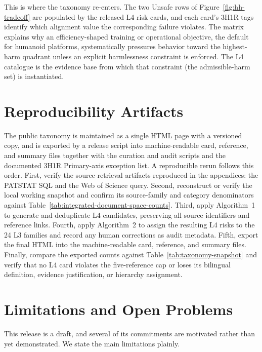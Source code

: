 \documentclass[11pt]{article}
\begin{document}
This is where the taxonomy re-enters. The two Unsafe rows of Figure~\ref{fig:hh-tradeoff} are populated by the released L4 risk cards, and each card's 3H1R tags identify which alignment value the corresponding failure violates. The matrix explains why an efficiency-shaped training or operational objective, the default for humanoid platforms, systematically pressures behavior toward the highest-harm quadrant unless an explicit harmlessness constraint is enforced. The L4 catalogue is the evidence base from which that constraint (the admissible-harm set) is instantiated.

\section{Reproducibility Artifacts}

The public taxonomy is maintained as a single HTML page with a versioned copy, and is exported by a release script into machine-readable card, reference, and summary files together with the curation and audit scripts and the documented 3H1R Primary-axis exception list. A reproducible rerun follows this order. First, verify the source-retrieval artifacts reproduced in the appendices: the PATSTAT SQL and the Web of Science query. Second, reconstruct or verify the local working snapshot and confirm its source-family and category denominators against Table~\ref{tab:integrated-document-space-counts}. Third, apply Algorithm~1 to generate and deduplicate L4 candidates, preserving all source identifiers and reference links. Fourth, apply Algorithm~2 to assign the resulting L4 risks to the 24 L3 families and record any human corrections as audit metadata. Fifth, export the final HTML into the machine-readable card, reference, and summary files. Finally, compare the exported counts against Table~\ref{tab:taxonomy-snapshot} and verify that no L4 card violates the five-reference cap or loses its bilingual definition, evidence justification, or hierarchy assignment.

\section{Limitations and Open Problems}

This release is a draft, and several of its commitments are motivated rather than yet demonstrated. We state the main limitations plainly.
\end{document}
